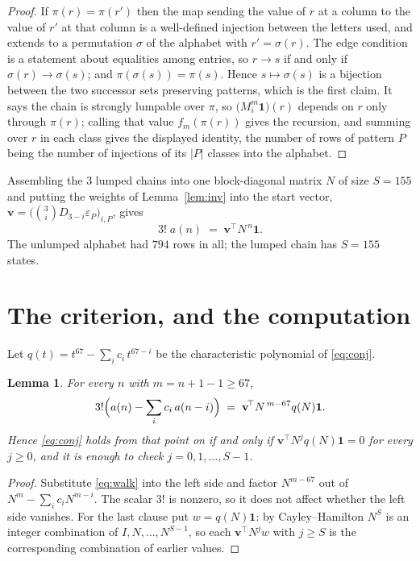\documentclass[11pt,a4paper]{article}
\theoremstyle{plain}
\newtheorem{lemma}[theorem]{Lemma}
\theoremstyle{definition}
\begin{document}
\begin{proof}
If $\pi(r)=\pi(r')$ then the map sending the value of $r$ at a column to the value of $r'$
at that column is a well-defined injection between the letters used, and extends to a
permutation $\sigma$ of the alphabet with $r'=\sigma(r)$. The edge condition is a statement
about equalities among entries, so $r\to s$ if and only if $\sigma(r)\to\sigma(s)$; and
$\pi(\sigma(s))=\pi(s)$. Hence $s\mapsto\sigma(s)$ is a bijection between the two successor
sets preserving patterns, which is the first claim. It says the chain is strongly lumpable
over $\pi$, so $\bigl(M_i^{m}\mathbf{1}\bigr)(r)$ depends on $r$ only through $\pi(r)$;
calling that value $f_m(\pi(r))$ gives the recursion, and summing over $r$ in each class
gives the displayed identity, the number of rows of pattern $P$ being the number of
injections of its $|P|$ classes into the alphabet.
\end{proof}

Assembling the $3$ lumped chains into one block-diagonal matrix $N$ of size $S=155$ and
putting the weights of Lemma~\ref{lem:inv} into the start vector,
$\mathbf{v}=\bigl(\binom{3}{i}D_{3-i}\varepsilon_P\bigr)_{i,P}$, gives
\begin{equation}\label{eq:walk}
3!\;a(n)\;=\;\mathbf{v}^{\!\top}N^{\,n}\mathbf{1} .
\end{equation}
The unlumped alphabet had $794$ rows in all; the lumped chain has $S=155$ states.

\section{The criterion, and the computation}

Let $q(t)=t^{67}-\sum_i c_i\,t^{67-i}$ be the characteristic polynomial of
\eqref{eq:conj}.

\begin{lemma}\label{lem:crit}
For every $n$ with $m=n+1-1\ge67$,
\[
3!\Bigl(a(n)-\sum_i c_i\,a(n-i)\Bigr)\;=\;\mathbf{v}^{\!\top}N^{\,m-67}q(N)\mathbf{1} .
\]
Hence \eqref{eq:conj} holds from that point on if and only if
$\mathbf{v}^{\!\top}N^{j}q(N)\mathbf{1}=0$ for every $j\ge0$, and it is enough to check
$j=0,1,\dots,S-1$.
\end{lemma}

\begin{proof}
Substitute \eqref{eq:walk} into the left side and factor $N^{m-67}$ out of
$N^{m}-\sum_i c_iN^{m-i}$. The scalar $3!$ is nonzero, so it does not affect whether
the left side vanishes. For the last clause put $w=q(N)\mathbf{1}$: by Cayley--Hamilton
$N^{S}$ is an integer combination of $I,N,\dots,N^{S-1}$, so each
$\mathbf{v}^{\!\top}N^{j}w$ with $j\ge S$ is the corresponding combination of earlier
values.
\end{proof}
\end{document}
